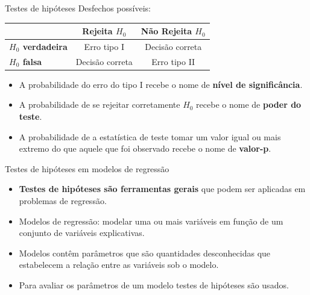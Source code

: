 \documentclass[
  ignorenonframetext,
  serif,
  professionalfont,
  usenames,
  dvipsnames,
  aspectratio = 169]{beamer}
\begin{document}
\begin{frame}{Testes de hipóteses}
\protect\hypertarget{testes-de-hipuxf3teses-3}{}
Desfechos possíveis:

\begin{table}[]
\begin{tabular}{l|cc}
\hline
\multicolumn{1}{c|}{}    & \textbf{Rejeita $H_0$} & \textbf{Não Rejeita $H_0$} \\ \hline
\textbf{$H_0$ verdadeira} & Erro tipo I           & Decisão correta           \\
\textbf{$H_0$ falsa}      & Decisão correta       & Erro tipo II              \\ \hline
\end{tabular}
\label{tab:my-table}
\end{table}

\begin{itemize}
    \itemsep 2ex
  
  \item A probabilidade do erro do tipo I recebe o nome de \textbf{nível de significância}.
  
  \item A probabilidade de se rejeitar corretamente $H_0$ recebe o nome de \textbf{poder do teste}.
  
  \item A probabilidade de a estatística de teste tomar um valor igual ou mais extremo do que aquele que foi observado recebe o nome de \textbf{valor-p}.
    
  \end{itemize}
\end{frame}

\begin{frame}{Testes de hipóteses em modelos de regressão}
\protect\hypertarget{testes-de-hipuxf3teses-em-modelos-de-regressuxe3o-1}{}
\begin{itemize}
  \itemsep 2ex

  \item \textbf{Testes de hipóteses são ferramentas gerais} que podem ser aplicadas em problemas de regressão.
  
  \item Modelos de regressão: modelar uma ou mais variáveis em função de um conjunto de variáveis explicativas. 

  \item Modelos contêm parâmetros que são quantidades desconhecidas que estabelecem a relação entre as variáveis sob o modelo. 

  \item Para avaliar os parâmetros de um modelo testes de hipóteses são usados.

\end{itemize}
\end{frame}
\end{document}
